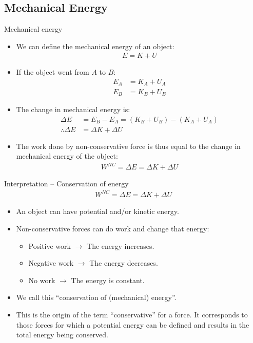 \documentclass[aspectratio=169,
hyperref={colorlinks,urlcolor=blue}
]{beamer}
\begin{document}
\subsection{Mechanical Energy}
\label{subsec:mechanicalenergy}
\begin{frame}{Mechanical energy}
\begin{itemize}
\item We can define the mechanical energy of an object:
\begin{align*}
E=K+U
\end{align*}
\item If the object went from $A$ to $B$:
\begin{align*}
E_A&=K_A+U_A\\
E_B&=K_B+U_B
\end{align*}
\item The change in mechanical energy is:
\begin{align*}
\Delta E&=E_B-E_A=(K_B+U_B)-(K_A+U_A)\\
\therefore \Delta E&=\Delta K + \Delta U
\end{align*}
\item The work done by non-conservative force is thus equal to the change in mechanical energy of the object:
\begin{align*}
W^{NC}=\Delta E = \Delta K +\Delta U
\end{align*}
\end{itemize}

\end{frame}


\begin{frame}{Interpretation – Conservation of energy}
\begin{align*}
W^{NC}=\Delta E = \Delta K +\Delta U
\end{align*}
\begin{itemize}
\item An object can have potential and/or kinetic energy.
\item Non-conservative forces can do work and change that energy:
\begin{itemize}
\item Positive work $\rightarrow$ The energy increases.
\item Negative work $\rightarrow$ The energy decreases.
\item No work $\rightarrow$ The energy is constant.
\end{itemize}
\item We call this ``conservation of (mechanical) energy''.
\item This is the origin of the term ``conservative'' for a force. It corresponds to those forces for which a potential energy can be defined and results in the total energy being conserved.
\end{itemize}

\end{frame}
\end{document}
